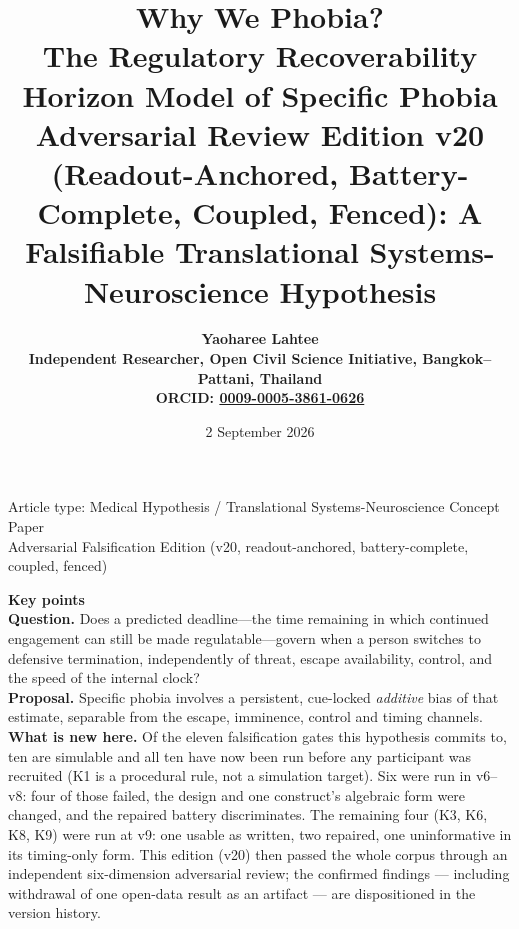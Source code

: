 \documentclass[9pt,twocolumn]{article}
\title{\vspace{-1.1em}
{\sffamily\bfseries\fontsize{19}{21}\selectfont\color{RRHMNavy} Why We Phobia?}\\[0.35em]
{\sffamily\bfseries\fontsize{12.0}{14}\selectfont The Regulatory Recoverability Horizon Model of Specific Phobia}\\[0.18em]
{\sffamily\fontsize{9.2}{11}\selectfont\color{RRHMSlate} Adversarial Review Edition v20 (Readout-Anchored, Battery-Complete, Coupled, Fenced): A Falsifiable Translational Systems-Neuroscience Hypothesis}}
\author{\sffamily\bfseries Yaoharee Lahtee\\[0.2em]
{\sffamily\mdseries\small Independent Researcher, Open Civil Science Initiative, Bangkok--Pattani, Thailand}\\
{\sffamily\mdseries\small ORCID: \href{https://orcid.org/0009-0005-3861-0626}{0009-0005-3861-0626}}}
\date{\sffamily\small 2 September 2026}
\begin{document}
\maketitle
\thispagestyle{fancy}

\begin{center}
\small\sffamily\color{RRHMSlate}
Article type: Medical Hypothesis / Translational Systems-Neuroscience Concept Paper\\
Adversarial Falsification Edition (v20, readout-anchored, battery-complete, coupled, fenced)
\end{center}

\vspace{0.15em}
\begin{center}
\end{center}

\vspace{0.35em}
\begin{center}
\parbox{0.95\columnwidth}{\footnotesize\sffamily\color{RRHMNavy}
\textbf{\color{RRHMSlate}Key points}\\[0.25em]
\textbf{Question.} Does a predicted deadline---the time remaining in which
continued engagement can still be made regulatable---govern when a person
switches to defensive termination, independently of threat, escape
availability, control, and the speed of the internal clock?\\[0.2em]
\textbf{Proposal.} Specific phobia involves a persistent, cue-locked
\emph{additive} bias of that estimate, separable from the escape, imminence,
control and timing channels.\\[0.2em]
\textbf{What is new here.} Of the eleven falsification gates this hypothesis
commits to, ten are simulable and all ten have now been run before any
participant was recruited (K1 is a procedural rule, not a simulation target).
Six were run in v6--v8: four of those failed, the design and one construct's
algebraic form were changed, and the repaired battery discriminates. The
remaining four (K3, K6, K8, K9) were run at v9: one usable as written, two
repaired, one uninformative in its timing-only form. This edition (v20) then
passed the whole corpus through an independent six-dimension adversarial
review; the confirmed findings --- including withdrawal of one open-data
result as an artifact --- are dispositioned in the version history.}
\end{center}
\end{document}

